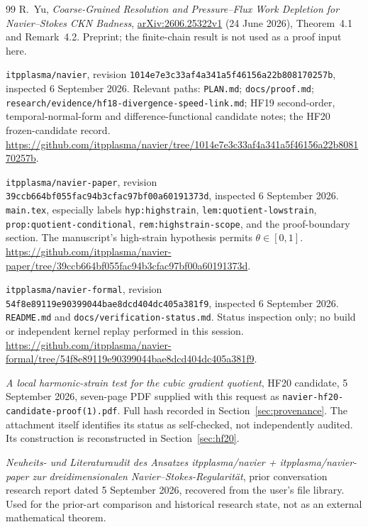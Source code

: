 \documentclass[11pt,a4paper]{article}
\theoremstyle{definition}
\newcommand{\repo}[1]{\texttt{#1}}
\begin{document}
\begin{thebibliography}{99}
R.~Yu, \emph{Coarse-Grained Resolution and Pressure--Flux Work Depletion for Navier--Stokes CKN Badness}, \href{https://arxiv.org/abs/2606.25322v1}{arXiv:2606.25322v1} (24 June 2026), Theorem~4.1 and Remark~4.2. Preprint; the finite-chain result is not used as a proof input here.

\repo{itpplasma/navier}, revision
\texttt{1014e7e3c33af4a341a5f46156a22b808170257b}, inspected 6 September 2026. Relevant paths: \repo{PLAN.md}; \repo{docs/proof.md}; \repo{research/evidence/hf18-divergence-speed-link.md}; HF19 second-order, temporal-normal-form and difference-functional candidate notes; the HF20 frozen-candidate record.\newline
\url{https://github.com/itpplasma/navier/tree/1014e7e3c33af4a341a5f46156a22b808170257b}.

\repo{itpplasma/navier-paper}, revision
\texttt{39ccb664bf055fac94b3cfac97bf00a60191373d}, inspected 6 September 2026. \repo{main.tex}, especially labels \repo{hyp:highstrain}, \repo{lem:quotient-lowstrain}, \repo{prop:quotient-conditional}, \repo{rem:highstrain-scope}, and the proof-boundary section. The manuscript's high-strain hypothesis permits $\theta\in[0,1]$.\newline
\url{https://github.com/itpplasma/navier-paper/tree/39ccb664bf055fac94b3cfac97bf00a60191373d}.

\repo{itpplasma/navier-formal}, revision
\texttt{54f8e89119e90399044bae8dcd404dc405a381f9}, inspected 6 September 2026. \repo{README.md} and \repo{docs/verification-status.md}. Status inspection only; no build or independent kernel replay performed in this session.\newline
\url{https://github.com/itpplasma/navier-formal/tree/54f8e89119e90399044bae8dcd404dc405a381f9}.

\emph{A local harmonic-strain test for the cubic gradient quotient}, HF20 candidate, 5 September 2026, seven-page PDF supplied with this request as \repo{navier-hf20-candidate-proof(1).pdf}. Full hash recorded in Section~\ref{sec:provenance}. The attachment itself identifies its status as self-checked, not independently audited. Its construction is reconstructed in Section~\ref{sec:hf20}.

\emph{Neuheits- und Literaturaudit des Ansatzes itpplasma/navier + itpplasma/navier-paper zur dreidimensionalen Navier--Stokes-Regularit\"at}, prior conversation research report dated 5 September 2026, recovered from the user's file library. Used for the prior-art comparison and historical research state, not as an external mathematical theorem.


\end{thebibliography}
\end{document}
